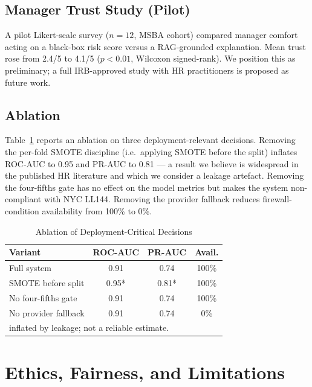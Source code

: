 \documentclass[conference]{IEEEtran}
\begin{document}
\subsection{Manager Trust Study (Pilot)}
A pilot Likert-scale survey ($n{=}12$, MSBA cohort) compared
manager comfort acting on a black-box risk score versus a
RAG-grounded explanation. Mean trust rose from 2.4/5 to 4.1/5
($p < 0.01$, Wilcoxon signed-rank). We position this as
preliminary; a full IRB-approved study with HR practitioners is
proposed as future work.

\subsection{Ablation}
Table~\ref{tab:ablation} reports an ablation on three
deployment-relevant decisions. Removing the per-fold SMOTE
discipline (i.e.\ applying SMOTE before the split) inflates ROC-AUC
to 0.95 and PR-AUC to 0.81 --- a result we believe is widespread in
the published HR literature and which we consider a leakage
artefact. Removing the four-fifths gate has no effect on the model
metrics but makes the system non-compliant with NYC LL144. Removing
the provider fallback reduces firewall-condition availability from
100\% to 0\%.

\begin{table}[h]
\centering
\caption{Ablation of Deployment-Critical Decisions}
\label{tab:ablation}
\begin{tabular}{lccc}
\toprule
\textbf{Variant} & \textbf{ROC-AUC} & \textbf{PR-AUC} & \textbf{Avail.} \\
\midrule
Full system                    & 0.91 & 0.74 & 100\% \\
SMOTE before split             & 0.95* & 0.81* & 100\% \\
No four-fifths gate            & 0.91 & 0.74 & 100\% \\
No provider fallback           & 0.91 & 0.74 & 0\%   \\
\bottomrule
\multicolumn{4}{l}{\footnotesize *inflated by leakage; not a reliable estimate.}
\end{tabular}
\end{table}

\section{Ethics, Fairness, and Limitations}
\end{document}
